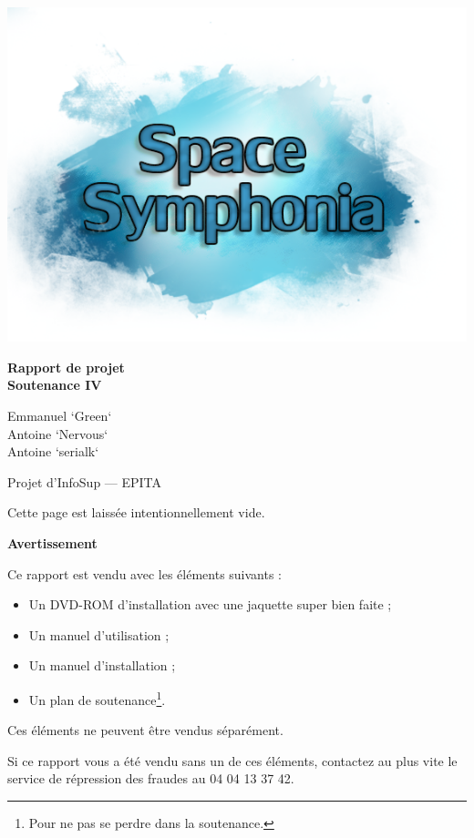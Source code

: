 \documentclass[12pt,a4paper]{article}
\title{}
\author{}
\date{}
\newcommand{\subtitle}{Rapport de projet\\Soutenance IV}
\begin{document}
	\begin{titlepage}
		\begin{center}
			\vspace{8cm}
			\includegraphics[width=15cm]{images/spacesymphonia.png}
			\vspace{0.5cm}
			\par \LARGE{\textbf{\subtitle}}
			\vspace{1cm}
			\par \large{\textsf{
				Emmanuel `Green`  \\
				Antoine `Nervous`  \\
				Antoine `serialk` }}
			\vspace{2cm}
			\par \large{\textsf{Projet d'InfoSup --- EPITA}}
		\end{center}
	\end{titlepage}
	
	\newpage
	Cette page est laissée intentionnellement vide.	
	
	\newpage
	\par \textbf{Avertissement}
	\vspace{2cm}
	\par Ce rapport est vendu avec les éléments suivants :
	\begin{itemize}
		\item Un DVD-ROM d'installation avec une jaquette super bien faite ;
		\item Un manuel d'utilisation ;
		\item Un manuel d'installation ;
		\item Un plan de soutenance\footnote{Pour ne pas se perdre dans la soutenance.}.
	\end{itemize}
	\vspace{1cm}
	\par Ces éléments ne peuvent être vendus séparément.
	\par Si ce rapport vous a été vendu
	sans un de ces éléments, contactez au plus vite le service de répression des fraudes
	au 04 04 13 37 42. 
	
\end{document}
